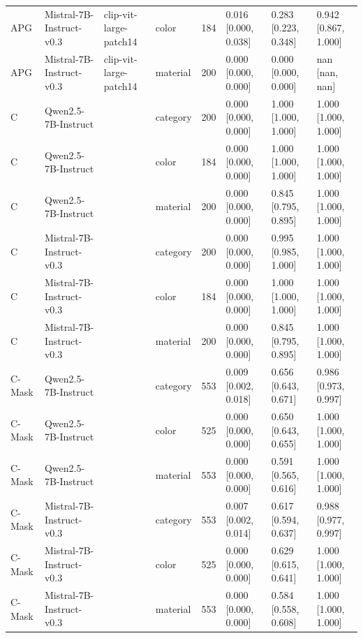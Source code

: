 \begin{tabular}{llllrlll}
APG & Mistral-7B-Instruct-v0.3 & clip-vit-large-patch14 & color & 184 & 0.016 [0.000, 0.038] & 0.283 [0.223, 0.348] & 0.942 [0.867, 1.000] \\
APG & Mistral-7B-Instruct-v0.3 & clip-vit-large-patch14 & material & 200 & 0.000 [0.000, 0.000] & 0.000 [0.000, 0.000] & nan [nan, nan] \\
C & Qwen2.5-7B-Instruct &  & category & 200 & 0.000 [0.000, 0.000] & 1.000 [1.000, 1.000] & 1.000 [1.000, 1.000] \\
C & Qwen2.5-7B-Instruct &  & color & 184 & 0.000 [0.000, 0.000] & 1.000 [1.000, 1.000] & 1.000 [1.000, 1.000] \\
C & Qwen2.5-7B-Instruct &  & material & 200 & 0.000 [0.000, 0.000] & 0.845 [0.795, 0.895] & 1.000 [1.000, 1.000] \\
C & Mistral-7B-Instruct-v0.3 &  & category & 200 & 0.000 [0.000, 0.000] & 0.995 [0.985, 1.000] & 1.000 [1.000, 1.000] \\
C & Mistral-7B-Instruct-v0.3 &  & color & 184 & 0.000 [0.000, 0.000] & 1.000 [1.000, 1.000] & 1.000 [1.000, 1.000] \\
C & Mistral-7B-Instruct-v0.3 &  & material & 200 & 0.000 [0.000, 0.000] & 0.845 [0.795, 0.895] & 1.000 [1.000, 1.000] \\
C-Mask & Qwen2.5-7B-Instruct &  & category & 553 & 0.009 [0.002, 0.018] & 0.656 [0.643, 0.671] & 0.986 [0.973, 0.997] \\
C-Mask & Qwen2.5-7B-Instruct &  & color & 525 & 0.000 [0.000, 0.000] & 0.650 [0.643, 0.655] & 1.000 [1.000, 1.000] \\
C-Mask & Qwen2.5-7B-Instruct &  & material & 553 & 0.000 [0.000, 0.000] & 0.591 [0.565, 0.616] & 1.000 [1.000, 1.000] \\
C-Mask & Mistral-7B-Instruct-v0.3 &  & category & 553 & 0.007 [0.002, 0.014] & 0.617 [0.594, 0.637] & 0.988 [0.977, 0.997] \\
C-Mask & Mistral-7B-Instruct-v0.3 &  & color & 525 & 0.000 [0.000, 0.000] & 0.629 [0.615, 0.641] & 1.000 [1.000, 1.000] \\
C-Mask & Mistral-7B-Instruct-v0.3 &  & material & 553 & 0.000 [0.000, 0.000] & 0.584 [0.558, 0.608] & 1.000 [1.000, 1.000] \\
\bottomrule
\end{tabular}
